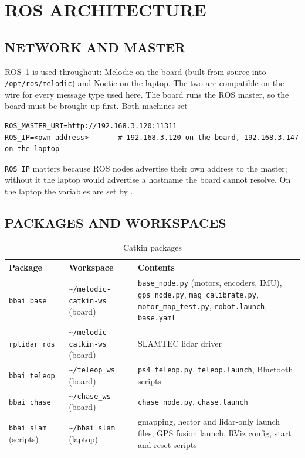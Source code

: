 \chapter{ROS ARCHITECTURE}
\label{ch:ros}

\section{NETWORK AND MASTER}

ROS~1 is used throughout: Melodic on the board (built from source into
\texttt{/opt/ros/melodic}) and Noetic on the laptop. The two are compatible on
the wire for every message type used here. The board runs the ROS master, so
the board must be brought up first. Both machines set
\begin{lstlisting}
ROS_MASTER_URI=http://192.168.3.120:11311
ROS_IP=<own address>       # 192.168.3.120 on the board, 192.168.3.147 on the laptop
\end{lstlisting}
\texttt{ROS\_IP} matters because ROS nodes advertise their own address to
the master; without it the laptop would advertise a hostname the board cannot
resolve. On the laptop the variables are set by
.

\section{PACKAGES AND WORKSPACES}

\begin{table}[htbp]
\centering
\caption{Catkin packages}
\label{tab:pkgs}
\small
\begin{tabularx}{\linewidth}{llX}
\toprule
Package & Workspace & Contents \\
\midrule
\texttt{bbai\_base} & \texttt{\textasciitilde/melodic-catkin-ws} (board) &
  \texttt{base\_node.py} (motors, encoders, IMU), \texttt{gps\_node.py},
  \texttt{mag\_calibrate.py}, \texttt{motor\_map\_test.py},
  \texttt{robot.launch}, \texttt{base.yaml} \\
\texttt{rplidar\_ros} & \texttt{\textasciitilde/melodic-catkin-ws} (board) &
  SLAMTEC lidar driver \\
\texttt{bbai\_teleop} & \texttt{\textasciitilde/teleop\_ws} (board) &
  \texttt{ps4\_teleop.py}, \texttt{teleop.launch}, Bluetooth scripts \\
\texttt{bbai\_chase} & \texttt{\textasciitilde/chase\_ws} (board) &
  \texttt{chase\_node.py}, \texttt{chase.launch} \\
\texttt{bbai\_slam} (scripts) & \texttt{\textasciitilde/bbai\_slam} (laptop) &
  gmapping, hector and lidar-only launch files, GPS fusion launch, RViz
  config, start and reset scripts \\
\bottomrule
\end{tabularx}
\end{table}

